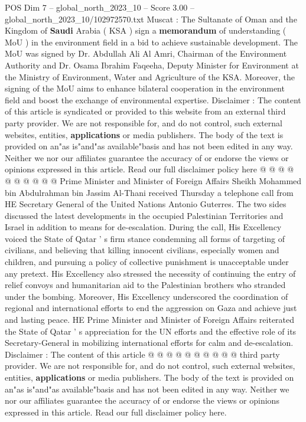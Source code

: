\begin{textsample}{POS Dim 7 – global\_north\_2023\_10 – Score 3.00 – global\_north\_2023\_10/102972570.txt}  \label{ex:f7_pos_421}
Muscat : The Sultanate of Oman and the Kingdom of \textbf{Saudi} Arabia ( KSA ) sign a \textbf{memorandum} of understanding ( MoU ) in the environment field in a bid to achieve sustainable development.
The MoU was signed by Dr.
Abdullah Ali Al Amri, Chairman of the Environment Authority and Dr.
Osama Ibrahim Faqeeha, Deputy Minister for Environment at the Ministry of Environment, Water and Agriculture of the KSA.
Moreover, the signing of the MoU aims to enhance bilateral cooperation in the environment field and boost the exchange of environmental expertise.
Disclaimer : The content of this article is syndicated or provided to this website from an external third party provider.
We are not responsible for, and do not control, such external websites, entities, \textbf{applications} or media publishers.
The body of the text is provided on an"as is"and"as available"basis and has not been edited in any way.
Neither we nor our affiliates guarantee the accuracy of or endorse the views or opinions expressed in this article.
Read our full disclaimer policy here @ @ @ @ @ @ @ @ @ @ Prime Minister and Minister of Foreign Affairs Sheikh Mohammed bin Abdulrahman bin Jassim Al-Thani received Thursday a telephone call from HE Secretary General of the United Nations Antonio Guterres.
The two sides discussed the latest developments in the occupied Palestinian Territories and Israel in addition to means for de-escalation.
During the call, His Excellency voiced the State of Qatar ' s firm stance condemning all forms of targeting of civilians, and believing that killing innocent civilians, especially women and children, and pursuing a policy of collective punishment is unacceptable under any pretext.
His Excellency also stressed the necessity of continuing the entry of relief convoys and humanitarian aid to the Palestinian brothers who stranded under the bombing.
Moreover, His Excellency underscored the coordination of regional and international efforts to end the aggression on Gaza and achieve just and lasting peace.
HE Prime Minister and Minister of Foreign Affairs reiterated the State of Qatar ' s appreciation for the UN efforts and the effective role of its Secretary-General in mobilizing international efforts for calm and de-escalation.
Disclaimer : The content of this article @ @ @ @ @ @ @ @ @ @ third party provider.
We are not responsible for, and do not control, such external websites, entities, \textbf{applications} or media publishers.
The body of the text is provided on an"as is"and"as available"basis and has not been edited in any way.
Neither we nor our affiliates guarantee the accuracy of or endorse the views or opinions expressed in this article.
Read our full disclaimer policy here.

\end{textsample}
